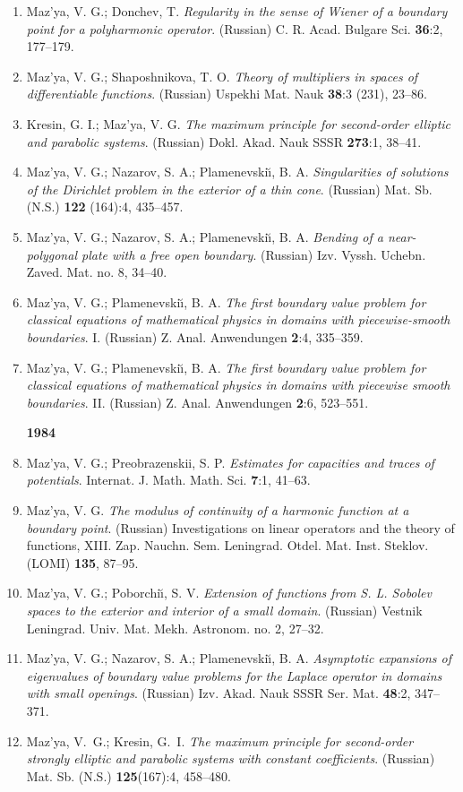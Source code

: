 \documentclass{article}
\begin{document}
\begin{enumerate}
\item Maz'ya, V. G.; Donchev, T. {\it Regularity in the sense of
Wiener of
a boundary point for a polyharmonic operator}.
(Russian) C. R. Acad. Bulgare Sci. {\bf 36}:2, 177--179.
\item Maz'ya, V. G.; Shaposhnikova, T. O. {\it Theory of multipliers
in
spaces of differentiable functions}.
(Russian) Uspekhi Mat. Nauk {\bf 38}:3 (231), 23--86.
\item Kresin, G. I.; Maz'ya, V. G. {\it The maximum principle for
second-order elliptic and parabolic systems}.
(Russian) Dokl. Akad. Nauk SSSR {\bf 273}:1, 38--41.
\item Maz'ya, V. G.; Nazarov, S. A.; Plamenevski{\u\i}, B. A. {\it
Singularities of solutions of the Dirichlet
problem in the exterior of a thin cone}. (Russian) Mat. Sb. (N.S.)
{\bf
122} (164):4, 435--457.
\item Maz'ya, V. G.; Nazarov, S. A.; Plamenevski{\u\i}, B. A. {\it
Bending
of a near-polygonal plate with a free open boundary}.
(Russian) Izv. Vyssh. Uchebn. Zaved. Mat. no. 8, 34--40.
\item Maz'ya, V. G.; Plamenevski{\u\i}, B. A. {\it The first boundary
value
problem for classical equations of mathematical physics
in domains with piecewise-smooth boundaries}. I. (Russian) Z. Anal.
Anwendungen {\bf 2}:4, 335--359.
\item Maz'ya, V. G.; Plamenevski{\u\i}, B. A. {\it The first boundary
value
problem for classical equations of
mathematical physics in domains with piecewise smooth boundaries}. II.
(Russian) Z. Anal. Anwendungen {\bf 2}:6,
523--551.\hfill\break

{\bf 1984}
\item Maz'ya, V. G.; Preobrazenskii, S. P. {\it Estimates for
capacities
and traces of potentials}.
Internat. J. Math. Math. Sci. {\bf 7}:1, 41--63.
\item Maz'ya, V. G. {\it The modulus of continuity of a harmonic
function
at a boundary point}.
(Russian) Investigations on linear operators and the theory of
functions,
XIII. Zap. Nauchn. Sem. Leningrad. Otdel. Mat. Inst.
Steklov. (LOMI) {\bf 135}, 87--95.
\item Maz'ya, V. G.; Poborchi{\u\i}, S. V. {\it Extension of functions
from
S. L. Sobolev spaces to
the exterior and interior of a small domain}. (Russian) Vestnik
Leningrad.
Univ. Mat. Mekh. Astronom. no. 2, 27--32.
\item Maz'ya, V. G.; Nazarov, S. A.; Plamenevski{\u\i}, B. A. {\it
Asymptotic expansions of eigenvalues of boundary value problems
for the Laplace operator in domains with small openings}. (Russian)
Izv.
Akad. Nauk SSSR Ser. Mat. {\bf 48}:2, 347--371.
\item Maz'ya, V.~G.; Kresin, G.~I. {\it The maximum principle for
second-order strongly elliptic and parabolic systems with constant
coefficients}. (Russian) Mat. Sb. (N.S.) {\bf 125}(167):4, 458--480.


\end{enumerate}
\end{document}
